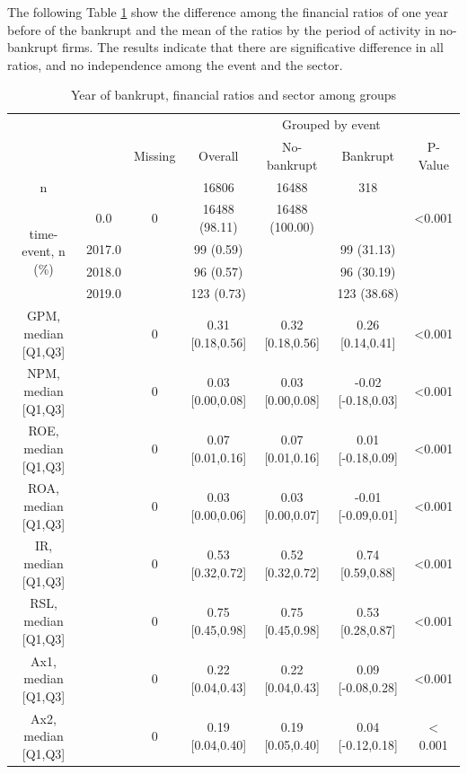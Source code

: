 \documentclass[journal]{IEEEtai}
\begin{document}
The following Table \ref{tableone} show the difference among the financial ratios of one year before of the bankrupt and the mean of the ratios by the period of activity in no-bankrupt firms.
The results indicate that there are significative difference in all ratios, and no independence among the event and the sector.


\begin{table}[h]
    \caption{Year of bankrupt, financial ratios and sector among groups}
    \label{tableone}
\setlength\tabcolsep{15pt}
\ContinuedFloat
    \centering
\begin{tabular*}{\textwidth}{@{}*{7}{c}} 
\toprule
& & & & \multicolumn{2}{c}{Grouped by event} \\
 \cmidrule{5-6}
 &  & Missing & Overall & No-bankrupt & Bankrupt & P-Value \\
n &  &  & 16806 & 16488 & 318 &  \\
\cline{1-7}

\multirow[t]{4}{*}{time-event, n (\%)}  & 0.0 & 0 & 16488 (98.11) & 16488 (100.00) &  & <0.001 \\
 & 2017.0 &  & 99 (0.59) &  & 99 (31.13) &  \\
 & 2018.0 &  & 96 (0.57) &  & 96 (30.19) &  \\
 & 2019.0 &  & 123 (0.73) &  & 123 (38.68) &  \\
 
GPM, median [Q1,Q3] &  & 0 & 0.31 [0.18,0.56] & 0.32 [0.18,0.56] & 0.26 [0.14,0.41] & <0.001 \\
NPM, median [Q1,Q3] &  & 0 & 0.03 [0.00,0.08] & 0.03 [0.00,0.08] & -0.02 [-0.18,0.03] & <0.001 \\
ROE, median [Q1,Q3] &  & 0 & 0.07 [0.01,0.16] & 0.07 [0.01,0.16] & 0.01 [-0.18,0.09] & <0.001 \\
ROA, median [Q1,Q3] &  & 0 & 0.03 [0.00,0.06] & 0.03 [0.00,0.07] & -0.01 [-0.09,0.01] & <0.001 \\
IR, median [Q1,Q3] &  & 0 & 0.53 [0.32,0.72] & 0.52 [0.32,0.72] & 0.74 [0.59,0.88] & <0.001 \\
RSL, median [Q1,Q3] &  & 0 & 0.75 [0.45,0.98] & 0.75 [0.45,0.98] & 0.53 [0.28,0.87] & <0.001 \\
Ax1, median [Q1,Q3] &  & 0 & 0.22 [0.04,0.43] & 0.22 [0.04,0.43] & 0.09 [-0.08,0.28] & <0.001 \\
Ax2, median [Q1,Q3] &  & 0 & 0.19 [0.04,0.40] & 0.19 [0.05,0.40] & 0.04 [-0.12,0.18] & $<$0.001 \\



\end{tabular*}
\end{table}
\end{document}
